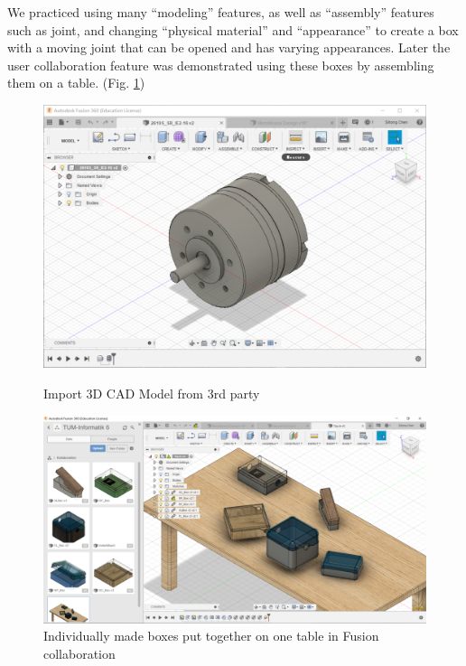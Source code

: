 We practiced using many “modeling” features, as well as “assembly” features such as joint, and changing “physical material” and “appearance” to create a box with a moving joint that can be opened and has varying appearances. Later the user collaboration feature was demonstrated using these boxes by assembling them on a table. (Fig. \ref{fig:fusion_collab_table})

\begin{figure}[htb]
    \begin{minipage}[b]{0.4\textwidth}
    	\includegraphics[width=\textwidth]{figures/Casing/FusionImport.PNG}
    	\caption{Import 3D CAD Model from 3rd party}
    	\label{fig:fusion_import}
  	\end{minipage}
 
  	\begin{minipage}[b]{0.4\textwidth}
  	  \includegraphics[width=\textwidth]{figures/Casing/FusionCollaborationTable.PNG}
  	  \caption{Individually made boxes put together on one table in Fusion collaboration}
  	  \label{fig:fusion_collab_table}
  	\end{minipage}
\end{figure}

